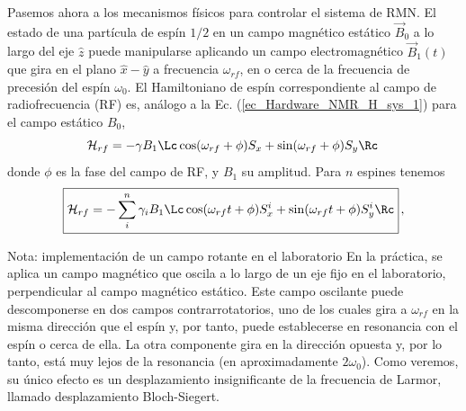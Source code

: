 
Pasemos ahora a los mecanismos físicos para controlar el sistema de RMN. El estado de una partícula de espín $1/2$ en un campo magnético estático $\vec{B}_0$ a lo largo del eje $\hat{z}$ puede manipularse aplicando un campo electromagnético $\vec{B}_1(t)$ que gira en el plano $\hat{x}-\hat{y}$ a frecuencia $\omega_{rf}$, en o cerca de la frecuencia de precesión del espín $\omega_0$. El Hamiltoniano de espín  correspondiente al campo de radiofrecuencia (RF) es, análogo a la Ec. (\ref{ec_Hardware_NMR_H_sys_1}) para el campo estático $B_0$,
	\begin{equation} 
	\mathcal{H}_{rf} = - \gamma B_1 \Lc \cos (\omega_{rf} + \phi) S_x + \sin (\omega_{rf} + \phi) S_y \Rc \,
	\end{equation}
donde $\phi$ es la fase del campo de RF, y $B_1$ su amplitud. Para $n$ espines tenemos
	\begin{equation} \label{ec_Hardware_NMR_H_rf}
	\boxed{\mathcal{H}_{rf} = - \sum_{i}^n \gamma_i B_1 \Lc \cos (\omega_{rf} t + \phi) S_x^i + \sin (\omega_{rf} t+ \phi ) S_y^i \Rc} \, ,
	\end{equation}
	
	\begin{mybox_blue}{Nota: implementación de un campo rotante en el laboratorio}
	En la práctica, se aplica un campo magnético que oscila a lo largo de un eje fijo en el
	laboratorio, perpendicular al campo magnético estático. Este campo oscilante puede
	descomponerse en dos campos contrarrotatorios, uno de los cuales gira a $\omega_{rf}$ en la
	misma dirección que el espín y, por tanto, puede establecerse en resonancia con el espín o
	cerca de ella. La  otra componente gira en la dirección opuesta y, por lo tanto, está muy 
	lejos de la resonancia (en aproximadamente $2\omega_0$). Como veremos, su único efecto es un
	desplazamiento insignificante de la frecuencia de Larmor, llamado desplazamiento Bloch-Siegert.
	\end{mybox_blue}

			
